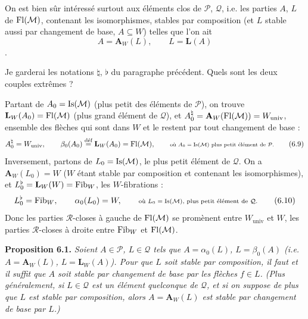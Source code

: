 On est bien sûr intéressé surtout aux éléments clos de $\mathcal{P}$, $\mathcal{Q}$, i.e. les parties $A$, $L$ de $\mathrm{Fl}(\mathcal{M})$, contenant les isomorphismes, stables par composition (et $L$ stable aussi par changement de base, $A \subseteq W$) telles que l'on ait
\[
A = \mathbf{A}_W(L), \qquad L = \mathbf{L}(A) \tag*{(6.8)}
\]
.


Je garderai les notations $\natural$, $\flat$ du paragraphe précédent. Quels sont les deux couples extrêmes ?

Partant de $A_0 = \mathrm{Is}(\mathcal{M})$ (plus petit des éléments de $\mathcal{P}$), on trouve $\mathbf{L}_W(A_0) = \mathrm{Fl}(\mathcal{M})$ (plus grand élément de $\mathcal{Q}$), et $A_0^{\natural} = \mathbf{A}_W(\mathrm{Fl}(\mathcal{M})) = W_{\mathrm{univ}}$, ensemble des flèches qui sont dans $W$ et le restent par tout changement de base :
\[
A_0^{\natural} = W_{\mathrm{univ}}, \qquad \beta_0(A_0) \overset{\text{déf}}{=} \mathbf{L}_W(A_0) = \Fl(\mathcal{M}), \qquad \text{\scriptsize où $A_0 = \Is(\mathcal{M})$ plus petit élément de $\mathcal{P}$.} \tag*{(6.9)}
\]
Inversement, partons de $L_0 = \mathrm{Is}(\mathcal{M})$, le plus petit élément de $\mathcal{Q}$. On a $\mathbf{A}_W(L_0) = W$ ($W$ étant stable par composition et contenant les isomorphismes), et $L_0^{\flat} = \mathbf{L}_W(W) = \mathrm{Fib}_W$, les $W$-fibrations :
\[
L_0^{\flat} = \Fib_W, \qquad \alpha_0(L_0) = W, \qquad \text{\scriptsize où $L_0 = \Is(\mathcal{M})$, plus petit élément de $\mathcal{Q}$.} \tag*{(6.10)}
\]
Donc les parties $\mathcal{R}$-closes à gauche de $\mathrm{Fl}(\mathcal{M})$ se promènent entre $W_{\mathrm{univ}}$ et $W$, les parties $\mathcal{R}$-closes à droite entre $\mathrm{Fib}_W$ et $\mathrm{Fl}(\mathcal{M})$.

\textbf{Proposition 6.1.} \textit{Soient $A \in \mathcal{P}$, $L \in \mathcal{Q}$ tels que $A = \alpha_0(L)$, $L = \beta_0(A)$ (i.e. $A = \mathbf{A}_W(L)$, $L = \mathbf{L}_W(A)$). Pour que $L$ soit stable par composition, il faut et il suffit que $A$ soit stable par changement de base par les flèches $f \in L$. (Plus généralement, si $L \in \mathcal{Q}$ est un élément quelconque de $\mathcal{Q}$, et si on suppose de}  \textit{plus que $L$ est stable par composition, alors $A = \mathbf{A}_W(L)$ est stable par changement de base par $L$.)}

